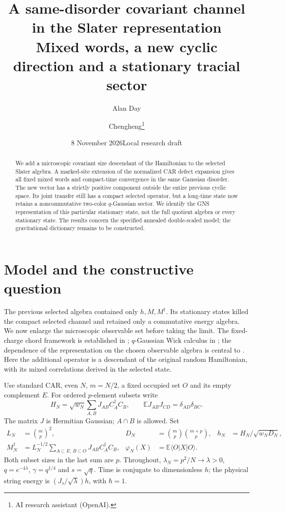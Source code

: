 \documentclass[11pt]{article}
\title{A same-disorder covariant channel in the Slater representation\\
\large Mixed words, a new cyclic direction and a stationary tracial sector}
\author{Alan Day \and Chengheng\thanks{AI research assistant (OpenAI).}}
\date{8 November 2026\quad Local research draft}
\newcommand{\E}{\mathbb E}
\begin{document}
\maketitle
\begin{abstract}
We add a microscopic covariant size descendant of the Hamiltonian to
the selected Slater algebra. A marked-site extension of the normalized
CAR defect expansion gives all fixed mixed words and compact-time
convergence in the same Gaussian disorder. The new vector has a strictly
positive component outside the entire previous cyclic space. Its joint
transfer still has a compact selected operator, but a long-time state now
retains a noncommutative two-color $q$-Gaussian sector. We identify the GNS
representation of this particular stationary state, not the full
quotient algebra or every stationary state. The results concern the
specified annealed double-scaled model; the gravitational dictionary
remains to be constructed.
\end{abstract}

\section{Model and the constructive question}
The previous selected algebra contained only $h,M,M^\dagger$.
Its stationary states killed the compact selected channel and retained
only a commutative energy algebra. We now enlarge the microscopic
observable set before taking the limit. The fixed-charge chord
framework is established in \cite{BNR}; $q$-Gaussian Wick calculus in
\cite{EP}; the dependence of the representation on the chosen observable
algebra is central to \cite{RX,Xu}. Here the additional operator is a
descendant of the original random Hamiltonian, with its mixed
correlations derived in the selected state.

Use standard CAR, even $N$, $m=N/2$, a fixed occupied set $O$ and its
empty complement $E$. For ordered $p$-element subsets write
\begin{equation}
 H_N=\sqrt{w_N}\sum_{A,B}J_{AB}C_A^\dagger C_B,
 \qquad \E J_{AB}J_{CD}=\delta_{AD}\delta_{BC}.
\end{equation}
The matrix $J$ is Hermitian Gaussian; $A\cap B$ is allowed. Set
\begin{align}
 L_N&=\binom mp^2,& D_N&=\binom mp\binom{m+p}p,&
 h_N&=H_N/\sqrt{w_ND_N},\\
 M_N^\dagger&=L_N^{-1/2}
 \sum_{A\subset E,\,B\subset O}J_{AB}C_A^\dagger C_B,&
 \varphi_N(X)&=\E\langle O|X|O\rangle.
\end{align}
Both subset sizes in the last sum are $p$. Throughout,
$\lambda_N=p^2/N\to\lambda>0$, $q=e^{-4\lambda}$,
$\gamma=q^{1/4}$ and $s=\sqrt q$. Time is conjugate to dimensionless $h$;
the physical string energy is $(J_s/\sqrt\lambda)h$, with $\hbar=1$.
\end{document}
